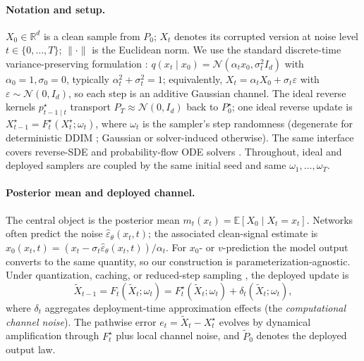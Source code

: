 \documentclass{article}
\theoremstyle{plain}
\theoremstyle{definition}
\theoremstyle{remark}
\begin{document}
\paragraph{Notation and setup.}
\(X_0 \in \mathbb{R}^d\) is a clean sample from \(P_0\); \(X_t\) denotes its
corrupted version at noise level \(t\in\{0,\dots,T\}\); \(\|\cdot\|\) is the
Euclidean norm. We use the standard discrete-time variance-preserving
formulation \citep{ho2020ddpm}: \(q(x_t \mid x_0) = \mathcal{N}(\alpha_t x_0,
\sigma_t^2 I_d)\) with \(\alpha_0=1, \sigma_0=0\), typically
\(\alpha_t^2+\sigma_t^2=1\); equivalently, \(X_t = \alpha_t X_0 +
\sigma_t\varepsilon\) with \(\varepsilon \sim \mathcal{N}(0,I_d)\), so each
step is an additive Gaussian channel. The ideal reverse kernels
\(p^\star_{t-1 \mid t}\) transport \(P_T\approx\mathcal{N}(0,I_d)\) back to
\(P_0^\star\); one ideal reverse update is
\(X_{t-1}^\star = F_t^\star(X_t^\star;\omega_t)\), where \(\omega_t\) is the
sampler's step randomness (degenerate for deterministic DDIM
\citep{song2021ddim}; Gaussian or solver-induced otherwise). The same
interface covers reverse-SDE and probability-flow ODE solvers
\citep{song2021sde}. Throughout, ideal and deployed samplers are coupled by
the same initial seed and same \(\omega_1,\dots,\omega_T\).

\paragraph{Posterior mean and deployed channel.}
The central object is the posterior mean
\(m_t(x_t) = \mathbb{E}[X_0 \mid X_t = x_t]\). Networks often predict the
noise \(\hat\varepsilon_\theta(x_t,t)\); the associated clean-signal estimate
is \(\hat x_0(x_t,t) = (x_t - \sigma_t \hat\varepsilon_\theta(x_t,t))/\alpha_t\).
For \(x_0\)- or \(v\)-prediction the model output converts to the same
quantity, so our construction is parameterization-agnostic. Under
quantization, caching, or reduced-step sampling
\citep{shang2023ptqdm,ma2024deepcache,zhong2026iec}, the deployed update is
\begin{equation}
\tilde X_{t-1} = F_t(\tilde X_t;\omega_t)
= F_t^\star(\tilde X_t;\omega_t) + \delta_t(\tilde X_t;\omega_t),
\label{eq:approx_update}
\end{equation}
where \(\delta_t\) aggregates deployment-time approximation effects (the
\emph{computational channel noise}). The pathwise error
\(e_t = \tilde X_t - X_t^\star\) evolves by dynamical amplification through
\(F_t^\star\) plus local channel noise, and \(\tilde P_0\) denotes the
deployed output law.
\end{document}
